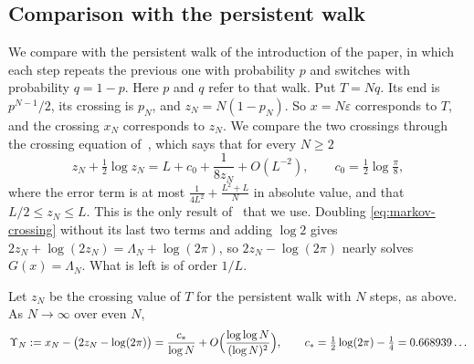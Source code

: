 \subsection{Comparison with the persistent walk}\label{or:markov}

We compare with the persistent walk of the introduction of the paper, in which each
step repeats the previous one with probability $p$ and switches with
probability $q=1-p$. Here $p$ and $q$ refer to that walk. Put $T=Nq$. Its end is $p^{N-1}/2$,
its crossing is $p_N$, and $z_N=N(1-p_N)$. So $x=N\varepsilon$ corresponds to $T$, and the
crossing $x_N$ corresponds to $z_N$. We compare the two crossings through the
crossing equation of~\cite[Proposition~3.8]{paperA}, which says that for every
$N\ge2$
\begin{equation}\label{eq:markov-crossing}
 z_N+\tfrac12\log z_N=L+c_0+\frac1{8z_N}+O(L^{-2}),\qquad
 c_0=\tfrac12\log\tfrac\pi8,
\end{equation}
where the error term is at most $\frac1{4L^2}+\frac{L^2+L}N$ in absolute
value, and that $L/2\le z_N\le L$. This is the only result of~\cite{paperA}
that we use. Doubling \eqref{eq:markov-crossing}
without its last two terms and adding $\log2$ gives $2z_N+\log(2z_N)=\Lambda_N+\log(2\pi)$, so
$2z_N-\log(2\pi)$ nearly solves $G(x)=\Lambda_N$. What is left is of order
$1/L$.

\begin{theorem}\label{thm:erw-markov}
Let $z_N$ be the crossing value of $T$ for the persistent walk with $N$ steps, as
above. As $N\to\infty$ over even $N$,
\[
 \Upsilon_N:=x_N-\bigl(2z_N-\log(2\pi)\bigr)=\frac{c_*}{\log N}
 +O\Bigl(\frac{\log\log N}{(\log N)^2}\Bigr),\qquad
 c_*=\tfrac12\log(2\pi)-\tfrac14=0.668939\ldots
\]
\end{theorem}

